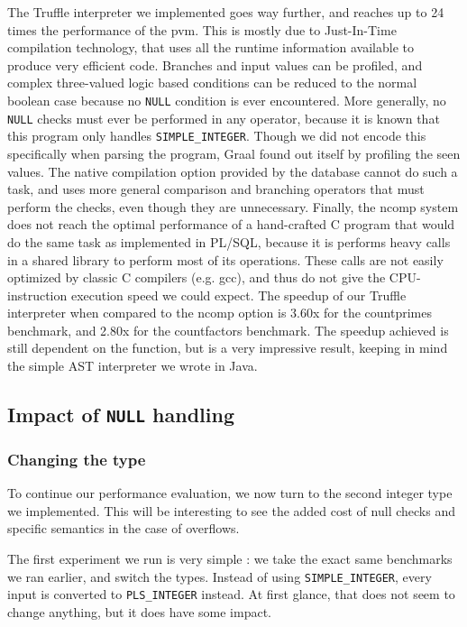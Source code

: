 \documentclass[twoside,11pt,a4paper]{article}
\newcommand{\pls}[1]{\texttt{#1}}
\newcommand{\plstype}[1]{\pls{#1}}
\newcommand{\plsi}{\plstype{PLS\_INTEGER}}
\newcommand{\simpleint}{\plstype{SIMPLE\_INTEGER}}
\newcommand{\plsnull}{\pls{NULL}}
\newcommand{\benchsystem}[1]{\textsf{#1}}
\newcommand{\pvm}{\benchsystem{pvm}}
\newcommand{\ncomp}{\benchsystem{ncomp}}
\newcommand{\bench}[1]{\textsf{#1}}
\begin{document}
The Truffle interpreter we implemented goes way further, and reaches up to 24 times the performance of the \pvm{}. This is mostly due to Just-In-Time compilation technology, that uses all the runtime information available to produce very efficient code. Branches and input values can be profiled, and complex three-valued logic based conditions can be reduced to the normal boolean case because no \plsnull{} condition is ever encountered. More generally, no \plsnull{} checks must ever be performed in any operator, because it is known that this program only handles \simpleint{}. Though we did not encode this specifically when parsing the program, Graal found out itself by profiling the seen values. The native compilation option provided by the database cannot do such a task, and uses more general comparison and branching operators that must perform the checks, even though they are unnecessary. Finally, the \ncomp{} system does not reach the optimal performance of a hand-crafted C program that would do the same task as implemented in PL/SQL, because it is performs heavy calls in a shared library to perform most of its operations. These calls are not easily optimized by classic C compilers (e.g. gcc), and thus do not give the CPU-instruction execution speed we could expect. The speedup of our Truffle interpreter when compared to the \ncomp{} option is 3.60x for the \bench{countprimes} benchmark, and 2.80x for the \bench{countfactors} benchmark. The speedup achieved is still dependent on the function, but is a very impressive result, keeping in mind the simple AST interpreter we wrote in Java.


\subsection{Impact of \plsnull{} handling}

\subsubsection{Changing the type}

To continue our performance evaluation, we now turn to the second integer type we implemented. This will be interesting to see the added cost of null checks and specific semantics in the case of overflows.

The first experiment we run is very simple : we take the exact same benchmarks we ran earlier, and switch the types. Instead of using \simpleint{}, every input is converted to \plsi{} instead. At first glance, that does not seem to change anything, but it does have some impact.
\end{document}
